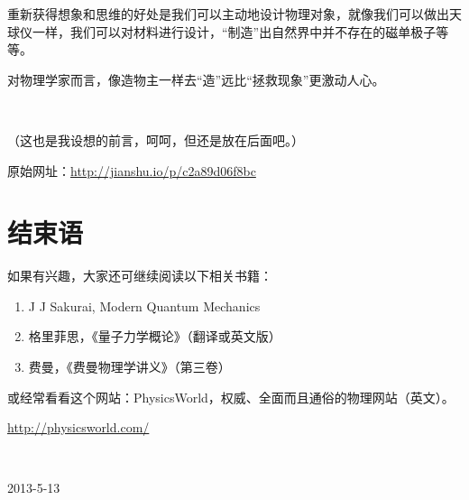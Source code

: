 重新获得想象和思维的好处是我们可以主动地设计物理对象，就像我们可以做出天球仪一样，我们可以对材料进行设计，“制造”出自然界中并不存在的磁单极子等等。

对物理学家而言，像造物主一样去“造”远比“拯救现象”更激动人心。



~~

（这也是我设想的前言，呵呵，但还是放在后面吧。）

原始网址：\url{http://jianshu.io/p/c2a89d06f8bc}


\section{结束语}

如果有兴趣，大家还可继续阅读以下相关书籍：

\begin{enumerate}
\item 

J J Sakurai, Modern Quantum Mechanics

\item

格里菲思，《量子力学概论》（翻译或英文版）

\item

费曼，《费曼物理学讲义》（第三卷）

\end{enumerate}

或经常看看这个网站：PhysicsWorld，权威、全面而且通俗的物理网站（英文）。

\url{http://physicsworld.com/}

~~

2013-5-13
